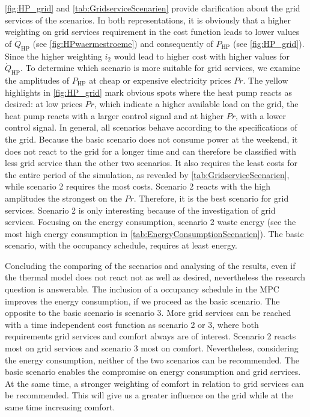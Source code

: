 \autoref{fig:HP_grid} and \autoref{tab:GridserviceScenarien} provide clarification about the grid services of the scenarios. In both representations, it is obviously that a higher weighting on grid services requirement in the cost function leads to lower values of $\dot{Q}_\text{HP}$ (see \autoref{fig:HPwaermestroeme}) and consequently of $P_\text{HP}$ (see \autoref{fig:HP_grid}). Since the higher weighting $i_\text{2}$ would lead to higher cost with higher values for $\dot{Q}_\text{HP}$. To determine which scenario is more suitable for grid services, we examine the amplitudes of $P_\text{HP}$ at cheap or expensive electricity prices $Pr$. The yellow highlights in \autoref{fig:HP_grid} mark obvious spots where the heat pump reacts as desired: at low prices $Pr$, which indicate a higher available load on the grid, the heat pump reacts with a larger control signal and at higher $Pr$, with a lower control signal. In general, all scenarios behave according to the specifications of the grid. Because the basic scenario does not consume power at the weekend, it does not react to the grid for a longer time and can therefore be classified with less grid service than the other two scenarios. It also requires the least costs for the entire period of the simulation, as revealed by \autoref{tab:GridserviceScenarien}, while scenario 2 requires the most costs. Scenario 2 reacts with the high amplitudes the strongest on the $Pr$. Therefore, it is the best scenario for grid services. Scenario 2 is only interesting because of the investigation of grid services. Focusing on the energy consumption, scenario 2 waste energy (see the most high energy consumption in \autoref{tab:EnergyConsumptionScenarien}). The basic scenario, with the occupancy schedule, requires at least energy. \newline

Concluding the comparing of the scenarios and analysing of the results, even if the thermal model does not react not as well as desired, nevertheless the research question is answerable. The inclusion of a occupancy schedule in the MPC improves the energy consumption, if we proceed as the basic scenario. The opposite to the basic scenario is scenario 3. More grid services can be reached with a time independent cost function as scenario 2 or 3, where both requirements grid services and comfort always are of interest. Scenario 2 reacts most on grid services and scenario 3 most on comfort. Nevertheless, considering the energy consumption, neither of the two scenarios can be recommended. The basic scenario enables the compromise on energy consumption and grid services. At the same time, a stronger weighting of comfort in relation to grid services can be recommended. This will give us a greater influence on the grid while at the same time increasing comfort.  

